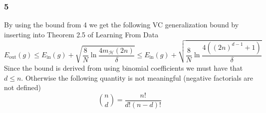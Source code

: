\subsubsection*{5}
By using the bound from 4 we get the following VC generalization bound by inserting into Theorem 2.5 of Learning From Data
\[E_{\text{out}}(g) \leq E_{\text{in}}(g) + \sqrt{ \frac{8}{N} \ln \frac{4m_{\mathcal{H}}(2n)}{\delta}} \leq E_{\text{in}}(g) + \sqrt{ \frac{8}{N} \ln \frac{4 \left((2n)^{d-1}+1 \right)}{\delta}} \] 
Since the bound is derived from using binomial coefficients we must have that $d \leq n$. Otherwise the following quantity is not meaningful (negative factorials are not defined) 
\[ \binom{n}{d}=\frac{n!}{d!(n-d)!}\]  